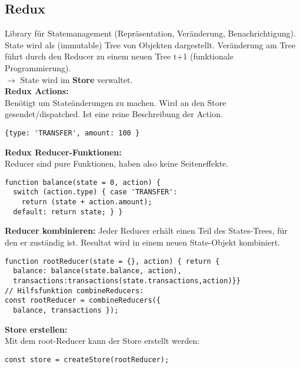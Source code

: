 \subsection{Redux}
Library für Statemanagement (Repräsentation, Veränderung, Benachrichtigung). State wird als (immutable) Tree von Objekten dargestellt. Veränderung am Tree führt durch den Reducer zu einem neuen Tree t+1 (funktionale Programmierung).\\
$\rightarrow$ State wird im \textbf{Store} verwaltet.\\
\textcolor{b}{\textbf{Redux Actions:}}\\
Benötigt um Stateänderungen zu machen. Wird an den Store gesendet/dispatched. Ist eine reine Beschreibung der Action.
\begin{lstlisting}[style=htmlcssjs]
{type: 'TRANSFER', amount: 100 }
\end{lstlisting}
\textcolor{b}{\textbf{Redux Reducer-Funktionen:}}\\
Reducer sind pure Funktionen, haben also keine Seiteneffekte.
\begin{lstlisting}[style=htmlcssjs]
function balance(state = 0, action) {
  switch (action.type) { case 'TRANSFER':
    return (state + action.amount);
  default: return state; } }
\end{lstlisting}
\textbf{Reducer kombinieren:} Jeder Reducer erhält einen Teil des States-Trees, für den er zuständig ist. Resultat wird in einem neuen State-Objekt kombiniert.
\begin{lstlisting}[style=htmlcssjs]
function rootReducer(state = {}, action) { return {
  balance: balance(state.balance, action),
  transactions:transactions(state.transactions,action)}}
// Hilfsfunktion combineReducers:
const rootReducer = combineReducers({
  balance, transactions });
\end{lstlisting}
\textcolor{b}{\textbf{Store erstellen:}}\\
Mit dem root-Reducer kann der Store erstellt werden:
\begin{lstlisting}[style=htmlcssjs]
const store = createStore(rootReducer);
\end{lstlisting}
